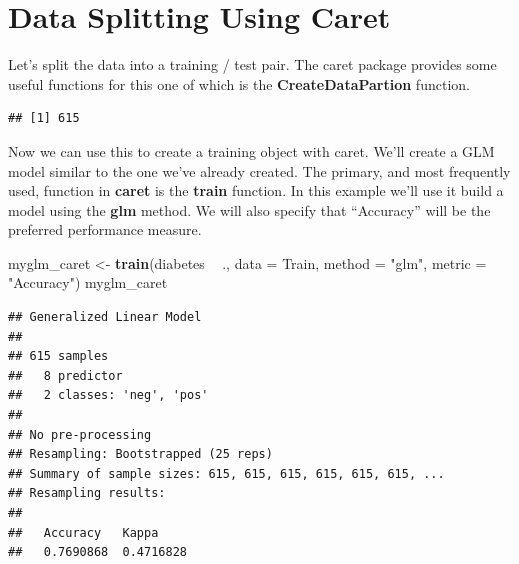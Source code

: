 \documentclass[]{book}
\newenvironment{Shaded}{\begin{snugshade}}{\end{snugshade}}
\newcommand{\KeywordTok}[1]{\textcolor[rgb]{0.13,0.29,0.53}{\textbf{#1}}}
\newcommand{\DataTypeTok}[1]{\textcolor[rgb]{0.13,0.29,0.53}{#1}}
\newcommand{\DecValTok}[1]{\textcolor[rgb]{0.00,0.00,0.81}{#1}}
\newcommand{\StringTok}[1]{\textcolor[rgb]{0.31,0.60,0.02}{#1}}
\newcommand{\OtherTok}[1]{\textcolor[rgb]{0.56,0.35,0.01}{#1}}
\newcommand{\OperatorTok}[1]{\textcolor[rgb]{0.81,0.36,0.00}{\textbf{#1}}}
\newcommand{\NormalTok}[1]{#1}
\begin{document}
\section{Data Splitting Using Caret}\label{data-splitting-using-caret}

Let's split the data into a training / test pair. The caret package
provides some useful functions for this one of which is the
\textbf{CreateDataPartion} function.

\begin{Shaded}
\end{Shaded}

\begin{verbatim}
## [1] 615
\end{verbatim}

Now we can use this to create a training object with caret. We'll create
a GLM model similar to the one we've already created. The primary, and
most frequently used, function in \textbf{caret} is the \textbf{train}
function. In this example we'll use it build a model using the
\textbf{glm} method. We will also specify that ``Accuracy'' will be the
preferred performance measure.

\begin{Shaded}
\begin{Highlighting}[]
\NormalTok{myglm_caret <-}\StringTok{ }\KeywordTok{train}\NormalTok{(diabetes }\OperatorTok{~}\StringTok{ }\NormalTok{.,}
                     \DataTypeTok{data =}\NormalTok{ Train,}
                     \DataTypeTok{method =} \StringTok{"glm"}\NormalTok{,}
                     \DataTypeTok{metric =} \StringTok{"Accuracy"}\NormalTok{)}
\NormalTok{myglm_caret}
\end{Highlighting}
\end{Shaded}

\begin{verbatim}
## Generalized Linear Model 
## 
## 615 samples
##   8 predictor
##   2 classes: 'neg', 'pos' 
## 
## No pre-processing
## Resampling: Bootstrapped (25 reps) 
## Summary of sample sizes: 615, 615, 615, 615, 615, 615, ... 
## Resampling results:
## 
##   Accuracy   Kappa    
##   0.7690868  0.4716828
\end{verbatim}
\end{document}
